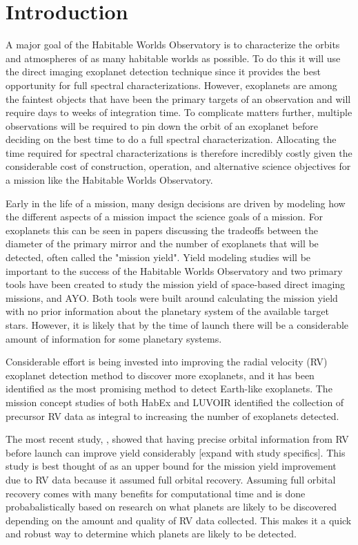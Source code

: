 \section{Introduction}
A major goal of the Habitable Worlds Observatory is to characterize the orbits
and atmospheres of as many habitable worlds as possible. To do this it will use
the direct imaging exoplanet detection technique since it provides the best
opportunity for full spectral characterizations. However, exoplanets are among
the faintest objects that have been the primary targets of an observation and
will require days to weeks of integration time. To complicate matters further,
multiple observations will be required to pin down the orbit of an exoplanet
before deciding on the best time to do a full spectral characterization.
Allocating the time required for spectral characterizations is therefore
incredibly costly given the considerable cost of construction, operation, and
alternative science objectives for a mission like the Habitable Worlds
Observatory.

Early in the life of a mission, many design decisions are driven by modeling
how the different aspects of a mission impact the science goals of a mission.
For exoplanets this can be seen in papers discussing the tradeoffs between the
diameter of the primary mirror and the number of exoplanets  that will be
detected, often called the "mission yield". Yield modeling studies will be
important to the success of the Habitable Worlds Observatory and two primary
tools have been created to study the mission yield of space-based direct
imaging missions,  and AYO. Both tools were built around calculating the
mission yield with no prior information about the planetary system of the
available target stars. However, it is likely that by the time of launch there
will be a considerable amount of information for some planetary systems.

Considerable effort is being invested into improving the radial velocity (RV)
exoplanet detection method to discover more exoplanets, and it has been
identified as the most promising method to detect Earth-like exoplanets. The
mission concept studies of both HabEx and LUVOIR identified the collection of
precursor RV data as integral to increasing the number of exoplanets detected.


The most recent study, \citet{morganExplorationExpectedNumber2022a}, showed
that having precise orbital information from RV before launch can improve yield
considerably [expand with study specifics]. This study is best thought of as an
upper bound for the mission yield improvement due to RV data because it assumed
full orbital recovery. Assuming full orbital recovery comes with many benefits
for computational time and is done probabalistically based on research on what
planets are likely to be discovered depending on the amount and quality of RV
data collected. This makes it a quick and robust way to determine which planets
are likely to be detected. 

